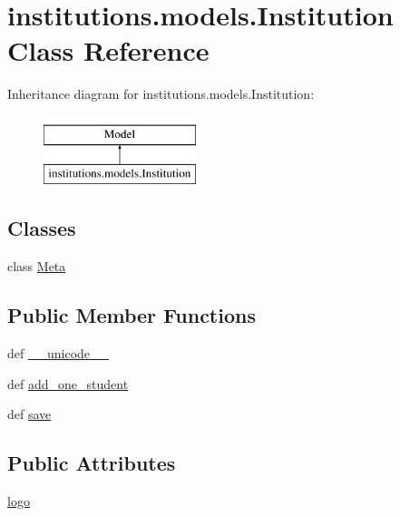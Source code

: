 \hypertarget{classinstitutions_1_1models_1_1_institution}{\section{institutions.\-models.\-Institution Class Reference}
\label{classinstitutions_1_1models_1_1_institution}
}
Inheritance diagram for institutions.\-models.\-Institution\-:\begin{figure}[H]
\begin{center}
\leavevmode
\includegraphics[height=2.000000cm]{classinstitutions_1_1models_1_1_institution}
\end{center}
\end{figure}
\subsection*{Classes}
\begin{DoxyCompactItemize}
\item 
class \hyperlink{classinstitutions_1_1models_1_1_institution_1_1_meta}{Meta}
\end{DoxyCompactItemize}
\subsection*{Public Member Functions}
\begin{DoxyCompactItemize}
\item 
def \hyperlink{classinstitutions_1_1models_1_1_institution_a345480746aaeecdbecb80b320ccdc699}{\-\_\-\-\_\-unicode\-\_\-\-\_\-}
\item 
def \hyperlink{classinstitutions_1_1models_1_1_institution_a8a187976b13da7d4e04555e1b78e4afe}{add\-\_\-one\-\_\-student}
\item 
def \hyperlink{classinstitutions_1_1models_1_1_institution_a37af1736128300624da93739f186e517}{save}
\end{DoxyCompactItemize}
\subsection*{Public Attributes}
\begin{DoxyCompactItemize}
\item 
\hyperlink{classinstitutions_1_1models_1_1_institution_a475660b2137b6a167330fb333a1947b9}{logo}
\end{DoxyCompactItemize}
